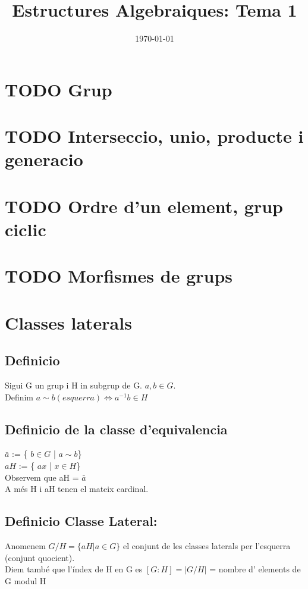 \documentclass[11pt]{article}
\date{\today}
\title{Estructures Algebraiques: Tema 1}
\begin{document}
\maketitle
\setcounter{tocdepth}{4}
\tableofcontents


\section{{\bfseries\sffamily TODO} Grup}
\label{sec:org03bf409}
\section{{\bfseries\sffamily TODO} Interseccio, unio, producte i generacio}
\label{sec:org0ee59dc}
\section{{\bfseries\sffamily TODO} Ordre d'un element, grup ciclic}
\label{sec:org267a00f}
\section{{\bfseries\sffamily TODO} Morfismes de grups}
\label{sec:org03a7a39}

\section{Classes laterals}
\label{sec:orgef4e261}
\subsection{Definicio}
\label{sec:org291f375}
Sigui G un grup i H in subgrup de G. \(a,b \in G\). \\
Definim \(a \sim b (esquerra) \iff a^{-1}b \in H\)
\subsection{Definicio de la classe d'equivalencia}
\label{sec:org1f64874}
\(\bar{a}\) := \{ \(b \in G\) | \(a \sim b\)\} \\
\(aH\) := \{ \(ax\) | \(x \in H\)\} \\
Observem que aH = \(\bar{a}\) \\
A més H i aH tenen el mateix cardinal.

\subsection{Definicio Classe Lateral:}
\label{sec:org8d6b397}
Anomenem \(G/H = \{aH | a \in G\}\) el conjunt de les classes laterals per l'esquerra (conjunt quocient). \\
Diem també que l'índex de H en G es \([G:H] = |G/H|\) = nombre d' elements de G modul H
\end{document}
